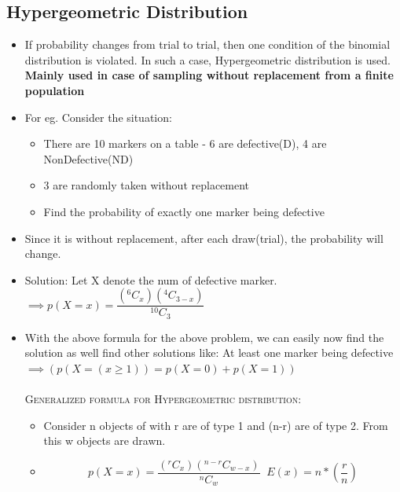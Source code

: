 \documentclass[8pt]{report}
\begin{document}
		\subsection{Hypergeometric Distribution}
			\begin{itemize}
				\item If probability changes from trial to trial, then one condition of the binomial distribution is violated. In such a case, Hypergeometric distribution is used. \textbf{Mainly used in case of sampling without replacement from a finite population}
				\item For eg. Consider the situation:
					\begin{itemize}
						\item There are 10 markers on a table - 6 are defective(D), 4 are NonDefective(ND)
						\item 3 are randomly taken without replacement
						\item Find the probability of exactly one marker being defective
					\end{itemize}
				\item Since it is without replacement, after each draw(trial), the probability will change. 
				\item Solution: Let X denote the num of defective marker. $\implies\boxed{p(X=x)=\dfrac{(^6C_x)(^4C_{3-x})}{^10C_3}}$
				\item With the above formula for the above problem, we can easily now find the solution as well find other solutions like: At least one marker being defective $\implies (p(X=(x\geq 1)) = p(X=0)+p(X=1))$\\\\
				\textsc{Generalized formula for Hypergeometric distribution:}
				\begin{itemize}
					\item Consider n objects of with r are of type 1 and (n-r) are of type 2. From this w objects are drawn.
					\item[] $$\boxed{p(X=x)=\dfrac{(^rC_x)(^{n-r}C_{w-x})}{^nC_w}}\;\;\boxed{E(x)=n*\left(\dfrac{r}{n}\right)}$$
				\end{itemize}
			\end{itemize}\hrulefill
\end{document}
